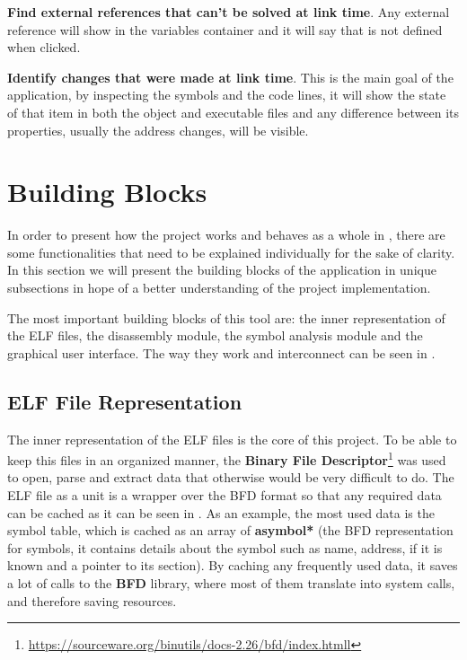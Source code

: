 \textbf{Find external references that can't be solved at link time}. Any external reference will show in the variables container and it will say that is not defined when clicked. 

\textbf{Identify changes that were made at link time}. This is the main goal of the application, by inspecting the symbols and the code lines, it will show the state of that item in both the object and executable files and any difference between its properties, usually the address changes, will be visible.

\section{Building Blocks}
\label{sec:build-blocks}

In order to present how the project works and behaves as a whole in , there are some functionalities that need to be explained individually for the sake of clarity. In this section we will present the building blocks of the application in unique subsections in hope of a better understanding of the project implementation.

The most important building blocks of this tool are: the inner representation of the ELF files, the disassembly module, the symbol analysis module and the graphical user interface. The way they work and interconnect can be seen in .


\subsection{ELF File Representation}
\label{sub-sec:elf-rep}

The inner representation of the ELF files is the core of this project. To be able to keep this files in an organized manner, the \textbf{Binary File Descriptor}\footnote{\url{https://sourceware.org/binutils/docs-2.26/bfd/index.htmll}} was used to open, parse and extract data that otherwise would be very difficult to do. The ELF file as a unit is a wrapper over the BFD format so that any required data can be cached as it can be seen in . As an example, the most used data is the symbol table, which is cached as an array of \textbf{asymbol*} (the BFD representation for symbols, it contains details about the symbol such as name, address, if it is known and a pointer to its section). By caching any frequently used data, it saves a lot of calls to the \textbf{BFD} library, where most of them translate into system calls, and therefore saving resources. 

